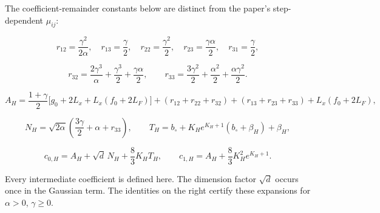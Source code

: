 \documentclass[11pt,a4paper]{report}
\begin{document}
The coefficient-remainder constants below are distinct from the paper’s step-dependent \(\mu_{ij}\):





\[r_{12}=\frac{\gamma^2}{2\alpha},\quad r_{13}=\frac\gamma2,\quad r_{22}=\frac{\gamma^2}{2},\quad r_{23}=\frac{\gamma\alpha}{2},\quad r_{31}=\frac\gamma2,\]







\[r_{32}=\frac{2\gamma^3}{\alpha}+\frac{\gamma^3}{2}+\frac{\gamma\alpha}{2},\qquad r_{33}=\frac{3\gamma^2}{2}+\frac{\alpha^2}{2}+\frac{\alpha\gamma^2}{2}.\]







\[A_H=\frac{1+\gamma}{2}\bigl[g_0+2L_x+L_x(f_0+2L_F)\bigr]+(r_{12}+r_{22}+r_{32})+(r_{13}+r_{23}+r_{33})+L_x(f_0+2L_F),\]







\[N_H=\sqrt{2\alpha}\left(\frac{3\gamma}{2}+\alpha+r_{33}\right),\qquad T_H=b_\circ+K_He^{K_H+1}(b_\circ+\beta_H)+\beta_H,\]







\[c_{0,H}=A_H+\sqrt d\,N_H+\frac83K_HT_H,\qquad c_{1,H}=A_H+\frac83K_H^2e^{K_H+1}.\]





Every intermediate coefficient is defined here. The dimension factor \(\sqrt d\) occurs once in the Gaussian term. The identities on the right certify these expansions for \(\alpha>0\), \(\gamma\ge0\).
\end{document}
